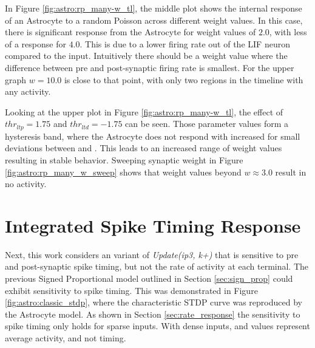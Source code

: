 In Figure \ref{fig:astro:rp_many-w_tl}, the middle plot shows the internal
response of an Astrocyte to a random Poisson across different weight values. In
this case, there is significant response from the Astrocyte for weight values of
$2.0$, with less of a response for $4.0$. This is due to a lower firing rate out
of the LIF neuron compared to the input. Intuitively there should be a weight
value where the difference between pre and post-synaptic firing rate is
smallest. For the upper graph $w=10.0$ is close to that point, with only two
regions in the timeline with any activity.


Looking at the upper plot in Figure \ref{fig:astro:rp_many-w_tl}, the effect of
$thr_{ltp}=1.75$ and $thr_{ltd}=-1.75$ can be seen. Those parameter values form
a hysteresis band, where the Astrocyte does not respond with increased \ca for
small deviations between \ipt and \kp. This leads to an increased range of
weight values resulting in stable behavior. Sweeping synaptic weight in Figure
\ref{fig:astro:rp_many_w_sweep} shows that weight values beyond $w \approx 3.0$
result in no \ca activity.



\section{Integrated Spike Timing Response} \label{section:istp}
Next, this work considers an variant of \emph{Update(ip3, k+)} that is sensitive
to pre and post-synaptic spike timing, but not the rate of activity at each
terminal. The previous Signed Proportional model outlined in Section
\ref{sec:sign_prop} could exhibit sensitivity to spike timing. This was
demonstrated in Figure \ref{fig:astro:classic_stdp}, where the characteristic
STDP curve was reproduced by the Astrocyte model. As shown in Section
\ref{sec:rate_response} the sensitivity to spike timing only holds for sparse
inputs. With dense inputs, \ipt and \kp values represent average activity, and not
timing.

